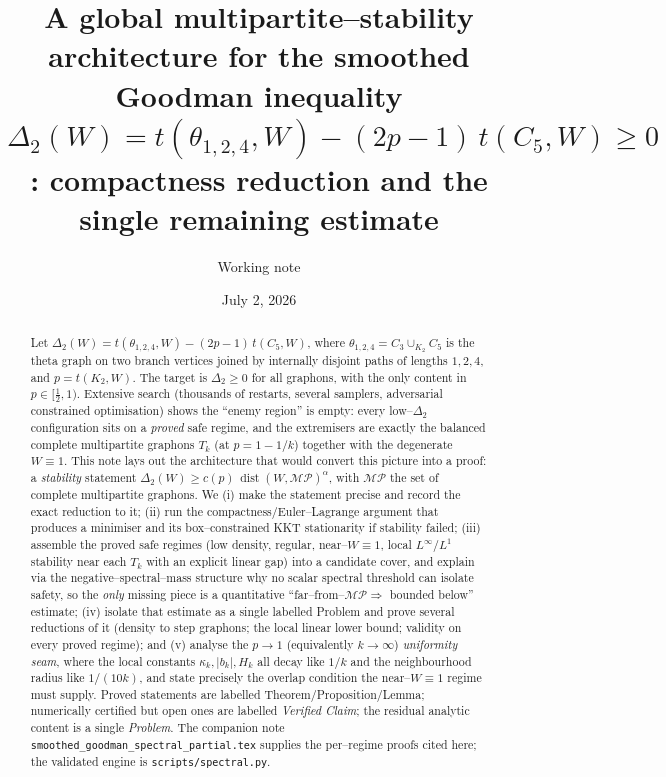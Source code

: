 \documentclass[11pt]{article}
\title{A global multipartite--stability architecture for the smoothed Goodman
inequality\\[2pt]
\large $\Delta_2(W)=t(\theta_{1,2,4},W)-(2p-1)\,t(C_5,W)\ge0$:
compactness reduction and the single remaining estimate}
\author{Working note}
\date{July 2, 2026}
\theoremstyle{definition}
\newcommand{\dist}{\operatorname{dist}}
\newcommand{\MP}{\mathcal{MP}}
\newcommand{\Tk}{T_k}
\begin{document}
\maketitle

\begin{abstract}
Let $\Delta_2(W)=t(\theta_{1,2,4},W)-(2p-1)\,t(C_5,W)$, where
$\theta_{1,2,4}=C_3\cup_{K_2}C_5$ is the theta graph on two branch vertices joined
by internally disjoint paths of lengths $1,2,4$, and $p=t(K_2,W)$.  The target is
$\Delta_2\ge0$ for all graphons, with the only content in $p\in[\tfrac12,1)$.
Extensive search (thousands of restarts, several samplers, adversarial
constrained optimisation) shows the ``enemy region'' is empty: every low--$\Delta_2$
configuration sits on a \emph{proved} safe regime, and the extremisers are exactly
the balanced complete multipartite graphons $\Tk$ (at $p=1-1/k$) together with the
degenerate $W\equiv1$.  This note lays out the architecture that would convert this
picture into a proof: a \emph{stability} statement
$\Delta_2(W)\ge c(p)\,\dist(W,\MP)^\alpha$, with $\MP$ the set of complete
multipartite graphons.  We (i) make the statement precise and record the exact
reduction to it; (ii) run the compactness/Euler--Lagrange argument that
produces a minimiser and its box--constrained KKT stationarity if stability failed;
(iii) assemble the proved safe regimes (low density, regular, near--$W\equiv1$,
local $L^\infty$/$L^1$ stability near each $\Tk$ with an explicit linear gap) into
a candidate cover, and explain via the negative--spectral--mass structure why no
scalar spectral threshold can isolate safety, so the \emph{only} missing piece is a
quantitative ``far--from--$\MP\Rightarrow$ bounded below'' estimate; (iv) isolate
that estimate as a single labelled Problem and prove several reductions of it
(density to step graphons; the local linear lower bound; validity on every proved
regime); and (v) analyse the $p\to1$ (equivalently $k\to\infty$) \emph{uniformity
seam}, where the local constants $\kappa_k,|b_k|,H_k$ all decay like $1/k$ and the
neighbourhood radius like $1/(10k)$, and state precisely the overlap condition the
near--$W\equiv1$ regime must supply.  Proved statements are labelled
Theorem/Proposition/Lemma; numerically certified but open ones are labelled
\emph{Verified Claim}; the residual analytic content is a single \emph{Problem}.
The companion note \texttt{smoothed\_goodman\_spectral\_partial.tex} supplies the
per--regime proofs cited here; the validated engine is \texttt{scripts/spectral.py}.
\end{abstract}
\end{document}
